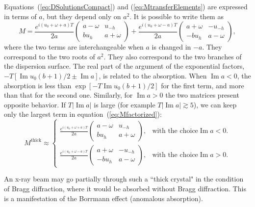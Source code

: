 \documentclass{iucr}
\begin{document}
Equations~(\ref{eq:DSolutionsCompact}) and (\ref{eq:MtransferElements}) are expressed in terms of $a$, but they depend only on $a^2$.
It is possible to write them as 
\begin{equation}\label{eq:Mfactorized}
    M =
    \frac{e^{i(u_0+\omega+a)T}}{2a}
    \begin{pmatrix}
    a-\omega & u_{-h}\\
    b u_h & a + \omega
    \end{pmatrix}
    + 
    \frac{e^{i(u_0+\omega-a)T}}{2a}
    \begin{pmatrix}
    a+\omega & -u_{-h}\\
    -b u_h & a - \omega
    \end{pmatrix}, 
\end{equation}
where the two terms are interchangeable when $a$ is changed in $-a$. They correspond to the two roots of $a^2$.
They also correspond to the two branches of the dispersion surface. 
The real part of the argument of the exponential factors, $-T [\operatorname{Im} u_0 (b+1)/2  \pm \operatorname{Im} a]$, is related to the absorption.
When $\operatorname{Im}a<0$, the absorption is less than $\exp[-T \operatorname{Im} u_0 (b+1)/2 ]$ for the first term, and more than that for the second one.
Similarly, for  $\operatorname{Im}a > 0$ the two matrices present opposite behavior.  If $T |\operatorname{Im}a|$ is large (for example $T |\operatorname{Im}a|  \gtrsim 5$), we can keep only the largest term in equation~(\ref{eq:Mfactorized}):
\begin{equation}\label{eq:Mthickapprox}
    M^{\text{thick}} \approx \begin{cases} 
    \frac{e^{i(u_0+\omega+a)T}}{2a}
    \begin{pmatrix}
    a-\omega & u_{-h}\\
    b u_h & a + \omega
    \end{pmatrix}, & \text{with the choice} \operatorname{Im}a<0.\\
    
    \frac{e^{i(u_0+\omega-a)T}}{2a}
    \begin{pmatrix}
    a+\omega & -u_{-h}\\
    -b u_h & a - \omega
    \end{pmatrix}, & \text{with the choice} \operatorname{Im}a>0.
    \end{cases}
\end{equation} 

An x-ray beam may go partially through such a ``thick crystal" in the condition of Bragg diffraction, where it would be absorbed without Bragg diffraction. This is a manifestation of the Borrmann effect (anomalous absorption).
\end{document}
